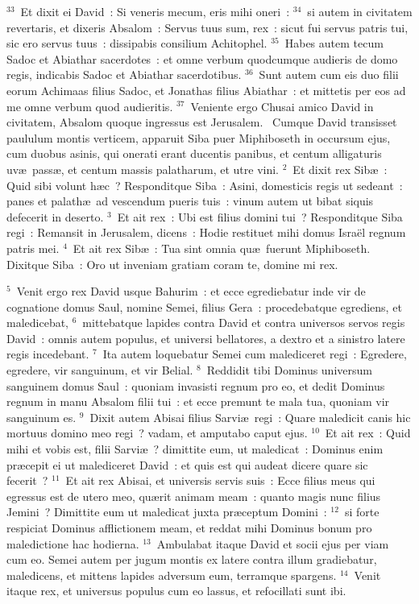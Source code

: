 ${}^{33}$~Et dixit ei David~: Si veneris mecum, eris mihi oneri~:
${}^{34}$~si autem in civitatem revertaris, et dixeris Absalom~: Servus tuus sum, rex~: sicut fui servus patris tui, sic ero servus tuus~: dissipabis consilium Achitophel.
${}^{35}$~Habes autem tecum Sadoc et Abiathar sacerdotes~: et omne verbum quodcumque audieris de domo regis, indicabis Sadoc et Abiathar sacerdotibus.
${}^{36}$~Sunt autem cum eis duo filii eorum Achimaas filius Sadoc, et Jonathas filius Abiathar~: et mittetis per eos ad me omne verbum quod audieritis.
${}^{37}$~Veniente ergo Chusai amico David in civitatem, Absalom quoque ingressus est Jerusalem.
~Cumque David transisset paululum montis verticem, apparuit Siba puer Miphiboseth in occursum ejus, cum duobus asinis, qui onerati erant ducentis panibus, et centum alligaturis uv\ae\ pass\ae , et centum massis palatharum, et utre vini.
${}^{2}$~Et dixit rex Sib\ae~: Quid sibi volunt h\ae c~? Responditque Siba~: Asini, domesticis regis ut sedeant~: panes et palath\ae\ ad vescendum pueris tuis~: vinum autem ut bibat siquis defecerit in deserto.
${}^{3}$~Et ait rex~: Ubi est filius domini tui~? Responditque Siba regi~: Remansit in Jerusalem, dicens~: Hodie restituet mihi domus Isra\"el regnum patris mei.
${}^{4}$~Et ait rex Sib\ae~: Tua sint omnia qu\ae\ fuerunt Miphiboseth. Dixitque Siba~: Oro ut inveniam gratiam coram te, domine mi rex.


${}^{5}$~Venit ergo rex David usque Bahurim~: et ecce egrediebatur inde vir de cognatione domus Saul, nomine Semei, filius Gera~: procedebatque egrediens, et maledicebat,
${}^{6}$~mittebatque lapides contra David et contra universos servos regis David~: omnis autem populus, et universi bellatores, a dextro et a sinistro latere regis incedebant.
${}^{7}$~Ita autem loquebatur Semei cum malediceret regi~: Egredere, egredere, vir sanguinum, et vir Belial.
${}^{8}$~Reddidit tibi Dominus universum sanguinem domus Saul~: quoniam invasisti regnum pro eo, et dedit Dominus regnum in manu Absalom filii tui~: et ecce premunt te mala tua, quoniam vir sanguinum es.
${}^{9}$~Dixit autem Abisai filius Sarvi\ae\ regi~: Quare maledicit canis hic mortuus domino meo regi~? vadam, et amputabo caput ejus.
${}^{10}$~Et ait rex~: Quid mihi et vobis est, filii Sarvi\ae~? dimittite eum, ut maledicat~: Dominus enim pr\ae cepit ei ut malediceret David~: et quis est qui audeat dicere quare sic fecerit~?
${}^{11}$~Et ait rex Abisai, et universis servis suis~: Ecce filius meus qui egressus est de utero meo, qu\ae rit animam meam~: quanto magis nunc filius Jemini~? Dimittite eum ut maledicat juxta pr\ae ceptum Domini~:
${}^{12}$~si forte respiciat Dominus afflictionem meam, et reddat mihi Dominus bonum pro maledictione hac hodierna.
${}^{13}$~Ambulabat itaque David et socii ejus per viam cum eo. Semei autem per jugum montis ex latere contra illum gradiebatur, maledicens, et mittens lapides adversum eum, terramque spargens.
${}^{14}$~Venit itaque rex, et universus populus cum eo lassus, et refocillati sunt ibi.


